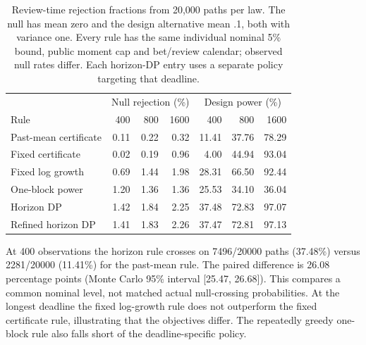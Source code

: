 \begin{table}[H]\centering\small

\begin{tabular}{lrrrrrr}

\toprule

& \multicolumn{3}{c}{Null rejection (\%)} & \multicolumn{3}{c}{Design power (\%)} \\

Rule & 400 & 800 & 1600 & 400 & 800 & 1600 \\

\midrule

Past-mean certificate & 0.11 & 0.22 & 0.32 & 11.41 & 37.76 & 78.29 \\

Fixed certificate & 0.02 & 0.19 & 0.96 & 4.00 & 44.94 & 93.04 \\

Fixed log growth & 0.69 & 1.44 & 1.98 & 28.31 & 66.50 & 92.44 \\

One-block power & 1.20 & 1.36 & 1.36 & 25.53 & 34.10 & 36.04 \\

Horizon DP & 1.42 & 1.84 & 2.25 & 37.48 & 72.83 & 97.07 \\

Refined horizon DP & 1.41 & 1.83 & 2.26 & 37.47 & 72.81 & 97.13 \\

\bottomrule\end{tabular}

\caption{Review-time rejection fractions from 20,000 paths per law. The null has mean zero and the design alternative mean .1, both with variance one. Every rule has the same individual nominal 5\% bound, public moment cap and bet/review calendar; observed null rates differ. Each horizon-DP entry uses a separate policy targeting that deadline.}\label{tab:lambda-power}\end{table}

At 400 observations the horizon rule crosses on 7496/20000 paths (37.48\%) versus 2281/20000 (11.41\%) for the past-mean rule. The paired difference is 26.08 percentage points (Monte Carlo 95\% interval [25.47, 26.68]). This compares a common nominal level, not matched actual null-crossing probabilities. At the longest deadline the fixed log-growth rule does not outperform the fixed certificate rule, illustrating that the objectives differ. The repeatedly greedy one-block rule also falls short of the deadline-specific policy.

